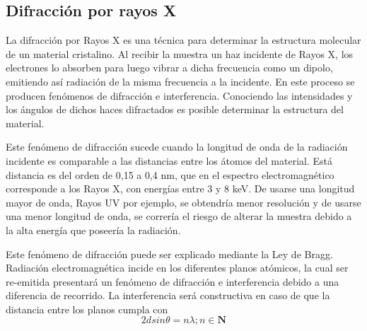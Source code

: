\documentclass{article}
\theoremstyle{definition}
\theoremstyle{remark}
\begin{document}
\subsection{Difracción por rayos X}
 La difracción por Rayos X es una técnica para determinar la estructura molecular de un material cristalino. Al recibir la muestra un haz incidente de Rayos X, los electrones lo absorben para luego vibrar a dicha frecuencia como un dipolo, emitiendo así radiación de la misma frecuencia a la incidente. En este proceso se producen fenómenos de difracción e interferencia.  Conociendo las intensidades y los ángulos de dichos haces difractados es posible determinar la estructura del material.
 
\begin{figure}[H]
\centering
{}
\end{figure}
 
 Este fenómeno de difracción sucede cuando la longitud de onda de la radiación incidente es comparable a las distancias entre los átomos del material. Está distancia es del orden de 0,15 a 0,4 nm, que en el espectro electromagnético corresponde a los Rayos X, con energías entre 3 y 8 keV. De usarse una longitud mayor de onda, Rayos UV por ejemplo, se obtendría menor resolución y de usarse una menor longitud de onda, se correría el riesgo de alterar la muestra debido a la alta energía que poseería la radiación.
 
 
 Este fenómeno de difracción puede ser explicado mediante la Ley de Bragg. Radiación electromagnética incide en los diferentes planos atómicos, la cual ser re-emitida presentará un fenómeno de difracción e interferencia debido a una diferencia de recorrido. La interferencia será constructiva en caso de que la distancia entre los planos cumpla con
 \begin{equation}
 2d sin \theta =n \lambda; n \in \mathbf{N}
 \end{equation}
 
\end{document}
